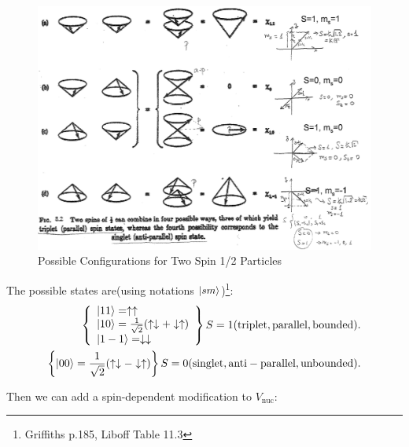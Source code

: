 \documentclass{school-22.101-notes}
\begin{document}
\begin{figure}[h!]
    \centering
    \includegraphics[width=5in]{images/deuteron/deuteron-possible-config.png}
    \caption{Possible Configurations for Two Spin 1/2 Particles}
\end{figure}


The possible states are(using notations $\left| s m \right>$)\footnote{Griffiths p.185, Liboff Table 11.3}: 
\begin{align}
\left\{ \begin{array}{l} 
\left| 1 1 \right> = \uparrow \uparrow \\
\left| 1 0 \right> = \frac{1}{\sqrt{2}} (\uparrow \downarrow + \downarrow \uparrow ) \\
\left| 1 -1 \right> = \downarrow \downarrow
\end{array} \right\}
S = 1 (\mathrm{triplet, parallel, bounded}). \\
\left\{ \left| 0 0 \right> = \frac{1}{\sqrt{2}} (\uparrow \downarrow - \downarrow \uparrow ) \right\} 
S = 0 (\mathrm{singlet, anti-parallel, unbounded}).
\end{align}

Then we can add a spin-dependent modification to $V_{\mathrm{nuc}}$:
\end{document}

